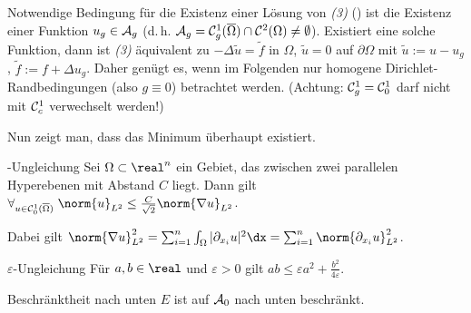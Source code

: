 \linie

\begin{Bem}
    Notwendige Bedingung für die Existenz einer Lösung von \emph{(3)}
    ()
    ist die Existenz einer Funktion $u_g \in \mathcal{A}_g$
    (d.\,h. $\mathcal{A}_g = \mathcal{C}^1_g(\overline{\Omega}) \cap \mathcal{C}^2(\Omega) \not= \emptyset$).
    Existiert eine solche Funktion,
    dann ist \emph{(3)} äquivalent zu
    $-\Delta \widetilde{u} = \widetilde{f}$ in $\Omega$, $\widetilde{u} = 0$ auf $\partial \Omega$
    mit $\widetilde{u} := u - u_g$, $\widetilde{f} := f + \Delta u_g$.
    Daher genügt es, wenn im Folgenden nur homogene Dirichlet-Randbedingungen (also $g \equiv 0$)
    betrachtet werden.
    (Achtung: $\mathcal{C}^1_g = \mathcal{C}^1_0$ darf nicht mit $\mathcal{C}^1_c$ verwechselt werden!)
\end{Bem}

\linie
\pagebreak

\begin{Bem}
    Nun zeigt man, dass das Minimum überhaupt existiert.
\end{Bem}

\begin{Satz}{-Ungleichung}
    Sei $\Omega \subset \real^n$ ein Gebiet, das zwischen zwei parallelen Hyperebenen
    mit Abstand $C$ liegt.
    Dann gilt $\forall_{u \in \C^1_0(\overline{\Omega})}\;
    \norm{u}_{L^2} \le \frac{C}{\sqrt{2}} \norm{\nabla u}_{L^2}$.
\end{Satz}

\begin{Bem}
    Dabei gilt $\norm{\nabla u}_{L^2}^2
    = \sum_{i=1}^n \int_\Omega |\partial_{x_i} u|^2 \dx
    = \sum_{i=1}^n \norm{\partial_{x_i} u}_{L^2}^2$.
\end{Bem}

\begin{Lemma}{$\varepsilon$-Ungleichung}
    Für $a, b \in \real$ und $\varepsilon > 0$ gilt
    $ab \le \varepsilon a^2 + \frac{b^2}{4\varepsilon}$.
\end{Lemma}

\begin{Satz}{Beschränktheit nach unten}
    $E$ ist auf $\mathcal{A}_0$ nach unten beschränkt.
\end{Satz}

\linie

